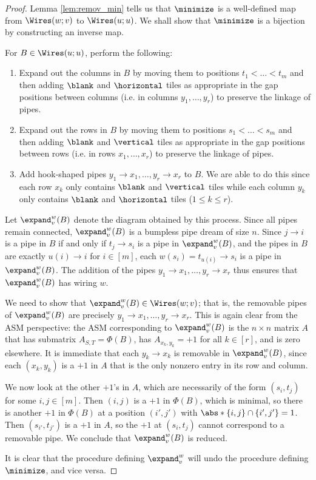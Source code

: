 \begin{proof}
    Lemma \ref{lem:remov_min} tells us that $\minimize$ is a well-defined map from $\Wires(w;v)$ to $\Wires(u;u)$.
    We shall show that $\minimize$ is a bijection by constructing an inverse map.
    
    For $B\in \Wires(u;u)$, perform the following:
    \begin{enumerate}
        \item[($1'$)] Expand out the columns in $B$ by moving them to positions $t_1<\dots<t_m$ and then adding $\blank$ and $\horizontal$ tiles as appropriate in the gap positions between columns (i.e. in columns $y_1,\dots,y_r$) to preserve the linkage of pipes.
        \item[($2'$)] Expand out the rows in $B$ by moving them to positions $s_1<\dots<s_m$ and then adding $\blank$ and $\vertical$ tiles as appropriate in the gap positions between rows (i.e. in rows $x_1,\dots,x_r$) to preserve the linkage of pipes.
        \item[($3'$)] Add hook-shaped pipes $y_1\to x_1,\dots,y_r\to x_r$ to $B$.
        We are able to do this since each row $x_k$ only contains $\blank$ and $\vertical$ tiles while each column $y_k$ only contains $\blank$ and $\horizontal$ tiles ($1\leq k\leq r$).
    \end{enumerate}
    Let $\expand_v^w(B)$ denote the diagram obtained by this process.
    Since all pipes remain connected, $\expand_v^w(B)$ is a bumpless pipe dream of size $n$.
    Since $j\to i$ is a pipe in $B$ if and only if $t_j\to s_i$ is a pipe in $\expand_v^w(B)$, and the pipes in $B$ are exactly $u(i)\to i$ for $i\in[m]$, each $w(s_i) = t_{u(i)} \to s_i$ is a pipe in $\expand_v^w(B)$.
    The addition of the pipes $y_1\to x_1,\dots, y_r\to x_r$ thus ensures that $\expand_v^w(B)$ has wiring $w$.
    
    We need to show that $\expand_v^w(B) \in \Wires(w;v)$; that is, the removable pipes of $\expand_v^w(B)$ are precisely $y_1\to x_1,\dots,y_r\to x_r$.
    This is again clear from the ASM perspective:
    the ASM corresponding to $\expand_v^w(B)$ is the $n\times n$ matrix $A$ that has submatrix $A_{S, T} = \Phi(B)$, has $A_{x_k,y_k} = +1$ for all $k\in[r]$, and is zero elsewhere.
    It is immediate that each $y_k\to x_k$ is removable in $\expand_v^w(B)$, since each $(x_k,y_k)$ is a $+1$ in $A$ that is the only nonzero entry in its row and column.

    We now look at the other $+1$'s in $A$, which are necessarily of the form $(s_i,t_j)$ for some $i,j\in[m]$.
    Then $(i,j)$ is a $+1$ in $\Phi(B)$, which is minimal, so there is another $+1$ in $\Phi(B)$ at a position $(i',j')$ with $\abs*{\{i,j\}\cap \{i',j'\}}=1$.
    Then $(s_{i'},t_{j'})$ is a $+1$ in $A$, so the $+1$ at $(s_i,t_j)$ cannot correspond to a removable pipe.
    We conclude that $\expand_v^w(B)$ is reduced.
    
    It is clear that the procedure defining $\expand_v^w$ will undo the procedure defining $\minimize$, and vice versa.
\end{proof}

